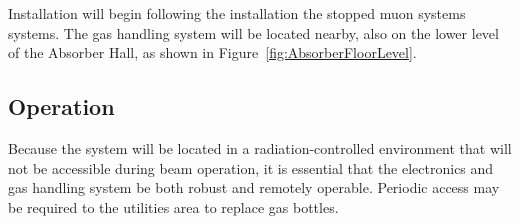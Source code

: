 Installation
will begin following the installation the stopped muon systems
systems. The gas handling system will be located nearby, also on the 
lower level of the Absorber Hall, as shown in Figure~\ref{fig:AbsorberFloorLevel}.

\subsection{Operation}

Because the system will be located in a radiation-controlled
environment that will not be accessible during beam operation, it is
essential that the electronics and gas handling system be both robust
and remotely operable.  Periodic access may be required to the utilities area to replace gas bottles.
